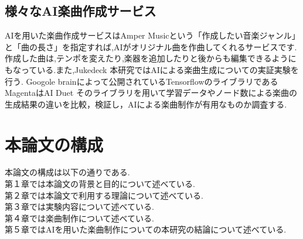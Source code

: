 \subsection{様々なAI楽曲作成サービス}
AIを用いた楽曲作成サービスはAmper Musicという「作成したい音楽ジャンル」と「曲の長さ」を指定すれば,AIがオリジナル曲を作曲してくれるサービスです. 作成した曲は,テンポを変えたり,楽器を追加したりと後からも編集できるようにもなっている.また,Jukedeck
本研究ではAIによる楽曲生成についての実証実験を行う.
Googole brainによって公開されているTensorflowのライブラリであるMagentaはAI Duet
そのライブラリを用いて学習データやノード数による楽曲の生成結果の違いを比較，検証し，AIによる楽曲制作が有用なものか調査する.\\
\section{本論文の構成}
本論文の構成は以下の通りである.\\
第１章では本論文の背景と目的について述べている.\\
第２章では本論文で利用する理論について述べている.\\
第３章では実験内容について述べている.\\
第４章では楽曲制作について述べている.\\
第５章ではAIを用いた楽曲制作についての本研究の結論について述べている.\\